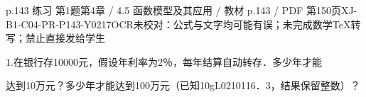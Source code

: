 \begin{bankitem}{p.143 练习 第1题}{第4章 / 4.5 函数模型及其应用 / 教材 p.143 / PDF 第150页}{XJ-B1-C04-PR-P143-Y0217}{OCR未校对：公式与文字均可能有误；未完成数学TeX转写；禁止直接发给学生}
\begin{ocrdraft}
\par
1.在银行存10000元，假设年利率为2％，每年结算自动转存．多少年才能
\par
达到10万元？多少年才能达到100万元（已知10gL0210116．3，结果保留整数）？
\end{ocrdraft}
\end{bankitem}

